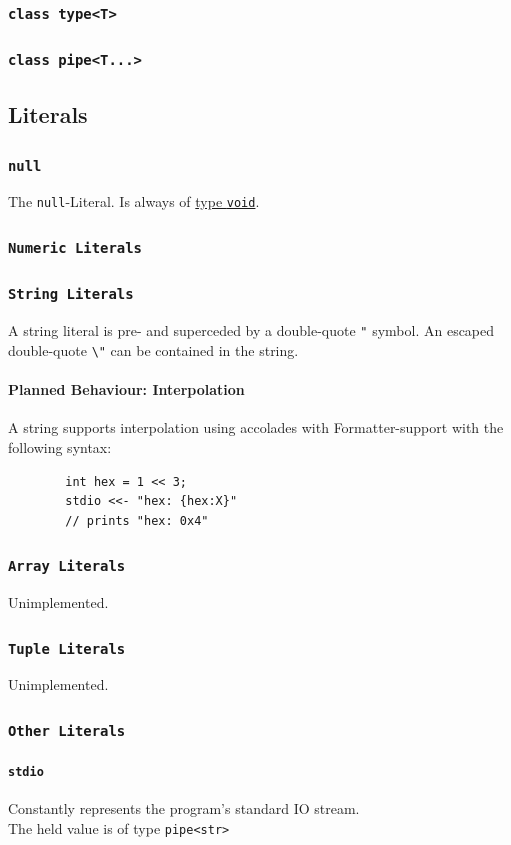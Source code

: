 \documentclass{docs}
\begin{document}
    \subsubsection{\texttt{class type<T>}}
    
    \subsubsection{\texttt{class pipe<T...>}}
    
    \subsection{Literals}
    
    \subsubsection{\texttt{null}}
    The \texttt{null}-Literal. Is always of \hyperref[typeVoid]{type \texttt{void}}.
    
    \subsubsection{\texttt{Numeric Literals}}
    
    \subsubsection{\texttt{String Literals}}
    A string literal is pre- and superceded by a double-quote \texttt{"} symbol.
    An escaped double-quote \texttt{\textbackslash"} can be contained in the string.
    
    \paragraph{Planned Behaviour: Interpolation}
    A string supports interpolation using accolades with Formatter-support with the following syntax:
    \begin{verbatim}
        int hex = 1 << 3;
        stdio <<- "hex: {hex:X}"
        // prints "hex: 0x4"
    \end{verbatim}
    
    \subsubsection{\texttt{Array Literals}}
    Unimplemented.
    
    \subsubsection{\texttt{Tuple Literals}}
    Unimplemented.
    
    \subsubsection{\texttt{Other Literals}}
    
    \paragraph{\texttt{stdio}}
    Constantly represents the program's standard IO stream. \\
    The held value is of type \texttt{pipe<str>}
\end{document}
